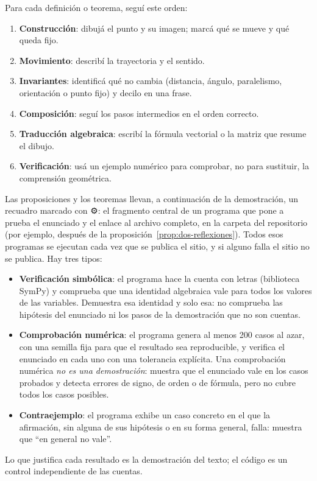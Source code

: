 \begin{idea}
Para cada definición o teorema, seguí este orden:
\begin{enumerate}
  \item \textbf{Construcción}: dibujá el punto y su imagen; marcá qué se mueve y qué queda fijo.
  \item \textbf{Movimiento}: describí la trayectoria y el sentido.
  \item \textbf{Invariantes}: identificá qué no cambia (distancia, ángulo, paralelismo,
  orientación o punto fijo) y decilo en una frase.
  \item \textbf{Composición}: seguí los pasos intermedios en el orden correcto.
  \item \textbf{Traducción algebraica}: escribí la fórmula vectorial o la matriz que resume el
  dibujo.
  \item \textbf{Verificación}: usá un ejemplo numérico para comprobar, no para sustituir, la
  comprensión geométrica.
\end{enumerate}
\end{idea}

\begin{idea}\label{caja:comprobaciones}
Las proposiciones y los teoremas llevan, a continuación de la demostración, un recuadro
marcado con {\sffamily ⚙}: el fragmento central de un programa que pone a prueba el enunciado
y el enlace al archivo completo, en la carpeta  del repositorio
(por ejemplo, después de la proposición~\ref{prop:dos-reflexiones}). Todos esos programas se
ejecutan cada vez que se publica el sitio, y si alguno falla el sitio no se publica. Hay tres
tipos:
\begin{itemize}
  \item \textbf{Verificación simbólica}: el programa hace la cuenta con letras (biblioteca
  SymPy) y comprueba que una identidad algebraica vale para todos los valores de las
  variables. Demuestra esa identidad y solo esa: no comprueba las hipótesis del enunciado ni
  los pasos de la demostración que no son cuentas.
  \item \textbf{Comprobación numérica}: el programa genera al menos 200 casos al azar, con
  una semilla fija para que el resultado sea reproducible, y verifica el enunciado en cada
  uno con una tolerancia explícita. Una comprobación numérica \emph{no es una
  demostración}: muestra que el enunciado vale en los casos probados y detecta errores de
  signo, de orden o de fórmula, pero no cubre todos los casos posibles.
  \item \textbf{Contraejemplo}: el programa exhibe un caso concreto en el que la afirmación,
  sin alguna de sus hipótesis o en su forma general, falla: muestra que \enquote{en general no vale}.
\end{itemize}
Lo que justifica cada resultado es la demostración del texto; el código es un control
independiente de las cuentas.
\end{idea}

